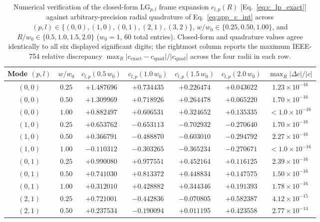 \documentclass[aps,pra,onecolumn,notitlepage,11pt,tightenlines,nofootinbib,floatfix,longbibliography]{revtex4-2}
\theoremstyle{remark}
\newcommand{\abs}[1]{\lvert #1 \rvert}
\begin{document}
\begin{table}[t]
\caption{Numerical verification of the closed-form $\mathrm{LG}_{p,l}$ frame expansion $c_{l,p}(R)$ [Eq.~\eqref{eq:c_lp_exact}] against arbitrary-precision radial quadrature of Eq.~\eqref{eq:app_c_int} across $(p,l) \in \{(0,0),(1,0),(0,1),(2,1),(3,2)\}$, $w/w_0 \in \{0.25,0.50,1.00\}$, and $R/w_0 \in \{0.5,1.0,1.5,2.0\}$ ($w_0 = 1$, 60 total entries). Closed-form and quadrature values agree identically to all six displayed significant digits; the rightmost column reports the maximum IEEE-754 relative discrepancy $\max_R \abs{c_{\mathrm{exact}} - c_{\mathrm{quad}}}/\abs{c_{\mathrm{quad}}}$ across the four radii in each row.}
\label{tab:c_lp_verification}
\begin{ruledtabular}
\footnotesize
\begin{tabular}{ccccccc}
Mode $(p,l)$ & $w/w_0$ & $c_{l,p}(0.5\,w_0)$ & $c_{l,p}(1.0\,w_0)$ & $c_{l,p}(1.5\,w_0)$ & $c_{l,p}(2.0\,w_0)$ & $\max_R \abs{\Delta c}/\abs{c}$ \\
\hline
$(0,0)$ & $0.25$ & $+1.487696$ & $+0.734435$ & $+0.226474$ & $+0.043622$ & $1.23\times 10^{-16}$ \\
$(0,0)$ & $0.50$ & $+1.309969$ & $+0.718926$ & $+0.264478$ & $+0.065220$ & $1.70\times 10^{-16}$ \\
$(0,0)$ & $1.00$ & $+0.882497$ & $+0.606531$ & $+0.324652$ & $+0.135335$ & $< 1.0\times 10^{-16}$ \\
\hline
$(1,0)$ & $0.25$ & $+0.653762$ & $-0.653113$ & $-0.702932$ & $-0.270640$ & $1.70\times 10^{-16}$ \\
$(1,0)$ & $0.50$ & $+0.366791$ & $-0.488870$ & $-0.603010$ & $-0.294792$ & $2.27\times 10^{-16}$ \\
$(1,0)$ & $1.00$ & $-0.110312$ & $-0.303265$ & $-0.365234$ & $-0.270671$ & $< 1.0\times 10^{-16}$ \\
\hline
$(0,1)$ & $0.25$ & $+0.990080$ & $+0.977551$ & $+0.452164$ & $+0.116125$ & $2.39\times 10^{-16}$ \\
$(0,1)$ & $0.50$ & $+0.741030$ & $+0.813372$ & $+0.448834$ & $+0.147575$ & $1.50\times 10^{-16}$ \\
$(0,1)$ & $1.00$ & $+0.312010$ & $+0.428882$ & $+0.344346$ & $+0.191393$ & $1.78\times 10^{-16}$ \\
\hline
$(2,1)$ & $0.25$ & $+0.721001$ & $-0.442836$ & $-0.070805$ & $+0.582387$ & $4.12\times 10^{-15}$ \\
$(2,1)$ & $0.50$ & $+0.237534$ & $-0.190094$ & $+0.011195$ & $+0.423558$ & $2.77\times 10^{-14}$ \\

\end{tabular}
\end{ruledtabular}
\end{table}
\end{document}
